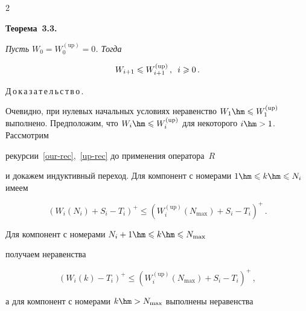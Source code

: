 \begin{multicols}{2}
\noindent



\textbf{Теорема~3.3.} 

\textit{Пусть $W_{0}=W^{(\mathrm{up})}_{0}=0$. Тогда}

\begin{equation}

W_{i+1}\leqslant W^{(\mathrm{up})}_{i+1}\,,\enskip i\geqslant 0\,.

\label{e11-mr}

\end{equation}





\noindent

Д\,о\,к\,а\,з\,а\,т\,е\,л\,ь\,с\,т\,в\,о\,.\

Очевидно, при нулевых начальных условиях неравенство $W_{1}\hm\leqslant

W^{(\mathrm{up})}_{1}$ выполнено. Предположим, что $W_{i}\hm\leqslant

W^{(\mathrm{up})}_{i}$ для некоторого $i\hm>1$.  Рассмотрим

рекурсии~\eqref{our-rec},~\eqref{up-rec} до применения оператора~$R$

и докажем индуктивный переход. Для компонент с номерами $1\hm\leqslant

k\hm\leqslant N_{i}$ имеем

\begin{equation*}


(W_{i}(N_{i})+S_{i}-T_{i})^{+}\leqslant (W^{(\mathrm{up})}_{i}(N_{\max})+S_{i}-T_{i})^{+}\,.

\end{equation*}

Для компонент с номерами $N_{i}+1\hm\leqslant k\hm\leqslant N_{\max}$

получаем неравенства

\begin{equation*}


(W_{i}(k)-T_{i})^{+}\leqslant

(W^{(\mathrm{up})}_{i}(N_{\max})+S_{i}-T_{i})^{+}\,,

\end{equation*}

а для компонент с номерами $k\hm> N_{\max}$ выполнены неравенства

\begin{equation*}


\end{equation*}
\end{multicols}
